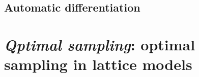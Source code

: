 
\subsection{Automatic differentiation}
\label{subsec:gbopt-autograd}

\section[\emph{Qptimal sampling}]{\emph{Qptimal sampling}: optimal sampling in lattice models}
